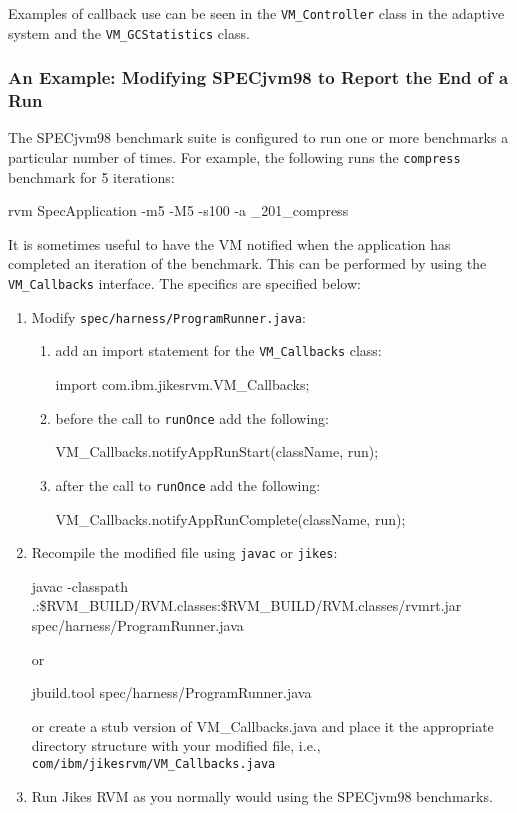 Examples of callback use can be seen in the {\tt VM\_Controller} class in the
adaptive system and the {\tt VM\_GCStatistics} class.

\subsubsection{An Example: Modifying SPECjvm98 to Report the End of a
                  Run}\label{sssec:callback-example}

The SPECjvm\Rboth{}98 benchmark suite is configured to run one or more
benchmarks 
a particular number of times.  For example, the following runs the
{\tt compress} benchmark for 5 iterations:
\begin{example}
 rvm SpecApplication -m5 -M5 -s100 -a \_201\_compress
\end{example}
It is sometimes useful to have the VM notified when the application
has completed an iteration of the benchmark.   This can be performed
by using the {\tt VM\_Callbacks} interface.  The specifics are
specified below:
\begin{enumerate}
\item Modify {\tt spec/harness/ProgramRunner.java}:
	\begin{enumerate}

	\item add an import statement for the {\tt VM\_Callbacks} class:
        \begin{example}
        import com.ibm.jikesrvm.VM\_Callbacks;
        \end{example}

	\item before the call to {\tt runOnce} add the following:
        \begin{example}
        VM\_Callbacks.notifyAppRunStart(className, run);
        \end{example}

	\item after the call to {\tt runOnce} add the following:
        \begin{example}
        VM\_Callbacks.notifyAppRunComplete(className, run);
        \end{example}

	\end{enumerate}

\item Recompile the modified file using {\tt javac} or {\tt jikes}:
\begin{example}
javac -classpath 
   .:\$RVM\_\-BUILD/\-RVM.clas\-ses:\$RVM\_\-BUILD/\-RVM.clas\-ses/\-rvmrt.jar
   spec/\-har\-ness/\-Pro\-gram\-Run\-ner.java
\end{example}
or
\begin{example}
jbuild.tool spec/\-har\-ness/\-Pro\-gram\-Run\-ner.java
\end{example}

or create a stub version of VM\_Callbacks.java and place
it the appropriate directory structure with your modified file, i.e., 
{\tt com/ibm/jikesrvm/VM\_Callbacks.java}

\item Run Jikes RVM as you normally would using the SPECjvm98 benchmarks.
\end{enumerate}

